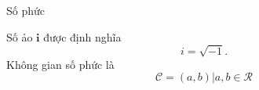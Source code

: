 \begin{frame}{Số phức}
    \begin{center}
        \begin{minipage}{0.4\linewidth}
            \resizebox{1\linewidth}{!}{}
        \end{minipage}
        \hspace{2mm}
        \begin{minipage}{0.4\linewidth}
            Số ảo \(\mathbf{i}\) được định nghĩa \cite{gilbert2009introduction}
            \begin{equation}
                i = \sqrt{-1}.
                \label{eq:1.1_1}
            \end{equation}
            Không gian số phức là 
            \begin{equation*}
                \mathcal{C} = (a,b) | a,b \in \mathcal{R}
            \end{equation*}
        \end{minipage}
    \end{center}
\end{frame}

